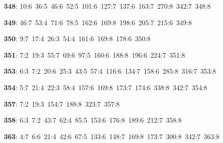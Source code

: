 \noindent \textbf{348}: 10:6\allowbreak\ 36:5\allowbreak\ 46:6\allowbreak\ 52:5\allowbreak\ 101:6\allowbreak\ 127:7\allowbreak\ 137:6\allowbreak\ 163:7\allowbreak\ 270:8\allowbreak\ 342:7\allowbreak\ 348:8\par
\noindent \textbf{349}: 46:7\allowbreak\ 53:4\allowbreak\ 71:6\allowbreak\ 78:5\allowbreak\ 162:6\allowbreak\ 169:8\allowbreak\ 198:6\allowbreak\ 205:7\allowbreak\ 215:6\allowbreak\ 349:8\par
\noindent \textbf{350}: 9:7\allowbreak\ 17:4\allowbreak\ 26:3\allowbreak\ 54:4\allowbreak\ 161:6\allowbreak\ 169:8\allowbreak\ 178:6\allowbreak\ 350:8\par
\noindent \textbf{351}: 7:2\allowbreak\ 19:3\allowbreak\ 55:7\allowbreak\ 69:6\allowbreak\ 97:5\allowbreak\ 160:6\allowbreak\ 188:8\allowbreak\ 196:6\allowbreak\ 224:7\allowbreak\ 351:8\par
\noindent \textbf{353}: 6:3\allowbreak\ 7:2\allowbreak\ 20:6\allowbreak\ 25:3\allowbreak\ 43:5\allowbreak\ 57:4\allowbreak\ 116:6\allowbreak\ 134:7\allowbreak\ 158:6\allowbreak\ 285:8\allowbreak\ 316:7\allowbreak\ 353:8\par
\noindent \textbf{354}: 5:7\allowbreak\ 21:4\allowbreak\ 22:3\allowbreak\ 58:4\allowbreak\ 157:6\allowbreak\ 169:8\allowbreak\ 173:7\allowbreak\ 174:6\allowbreak\ 338:8\allowbreak\ 342:7\allowbreak\ 354:8\par
\noindent \textbf{357}: 7:2\allowbreak\ 19:3\allowbreak\ 154:7\allowbreak\ 188:8\allowbreak\ 323:7\allowbreak\ 357:8\par
\noindent \textbf{358}: 6:3\allowbreak\ 7:2\allowbreak\ 43:7\allowbreak\ 62:4\allowbreak\ 85:5\allowbreak\ 153:6\allowbreak\ 176:8\allowbreak\ 189:6\allowbreak\ 212:7\allowbreak\ 358:8\par
\noindent \textbf{363}: 4:7\allowbreak\ 6:6\allowbreak\ 21:4\allowbreak\ 42:6\allowbreak\ 67:5\allowbreak\ 133:6\allowbreak\ 148:7\allowbreak\ 169:8\allowbreak\ 173:7\allowbreak\ 300:8\allowbreak\ 342:7\allowbreak\ 363:8\par
